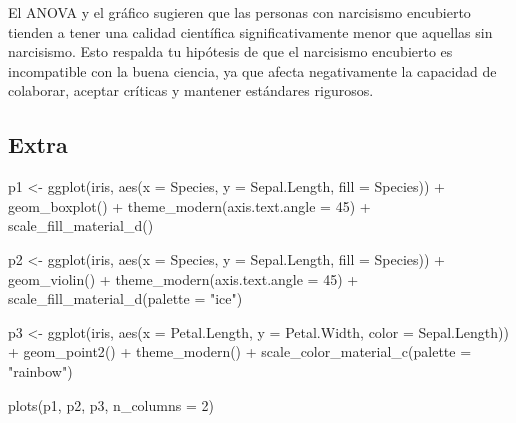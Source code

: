 \documentclass[
]{article}
\newenvironment{Shaded}{\begin{snugshade}}{\end{snugshade}}
\newcommand{\AttributeTok}[1]{\textcolor[rgb]{0.40,0.45,0.13}{#1}}
\newcommand{\DecValTok}[1]{\textcolor[rgb]{0.68,0.00,0.00}{#1}}
\newcommand{\FunctionTok}[1]{\textcolor[rgb]{0.28,0.35,0.67}{#1}}
\newcommand{\NormalTok}[1]{\textcolor[rgb]{0.00,0.23,0.31}{#1}}
\newcommand{\OtherTok}[1]{\textcolor[rgb]{0.00,0.23,0.31}{#1}}
\newcommand{\SpecialCharTok}[1]{\textcolor[rgb]{0.37,0.37,0.37}{#1}}
\newcommand{\StringTok}[1]{\textcolor[rgb]{0.13,0.47,0.30}{#1}}
\begin{document}
El ANOVA y el gráfico sugieren que las personas con narcisismo
encubierto tienden a tener una calidad científica significativamente
menor que aquellas sin narcisismo. Esto respalda tu hipótesis de que el
narcisismo encubierto es incompatible con la buena ciencia, ya que
afecta negativamente la capacidad de colaborar, aceptar críticas y
mantener estándares rigurosos.

\subsection{Extra}\label{extra}

\begin{Shaded}
\begin{Highlighting}[]
\NormalTok{p1 }\OtherTok{\textless{}{-}} \FunctionTok{ggplot}\NormalTok{(iris, }\FunctionTok{aes}\NormalTok{(}\AttributeTok{x =}\NormalTok{ Species, }\AttributeTok{y =}\NormalTok{ Sepal.Length, }\AttributeTok{fill =}\NormalTok{ Species)) }\SpecialCharTok{+}
  \FunctionTok{geom\_boxplot}\NormalTok{() }\SpecialCharTok{+}
  \FunctionTok{theme\_modern}\NormalTok{(}\AttributeTok{axis.text.angle =} \DecValTok{45}\NormalTok{) }\SpecialCharTok{+}
  \FunctionTok{scale\_fill\_material\_d}\NormalTok{()}

\NormalTok{p2 }\OtherTok{\textless{}{-}} \FunctionTok{ggplot}\NormalTok{(iris, }\FunctionTok{aes}\NormalTok{(}\AttributeTok{x =}\NormalTok{ Species, }\AttributeTok{y =}\NormalTok{ Sepal.Length, }\AttributeTok{fill =}\NormalTok{ Species)) }\SpecialCharTok{+}
  \FunctionTok{geom\_violin}\NormalTok{() }\SpecialCharTok{+}
  \FunctionTok{theme\_modern}\NormalTok{(}\AttributeTok{axis.text.angle =} \DecValTok{45}\NormalTok{) }\SpecialCharTok{+}
  \FunctionTok{scale\_fill\_material\_d}\NormalTok{(}\AttributeTok{palette =} \StringTok{"ice"}\NormalTok{)}

\NormalTok{p3 }\OtherTok{\textless{}{-}} \FunctionTok{ggplot}\NormalTok{(iris, }\FunctionTok{aes}\NormalTok{(}\AttributeTok{x =}\NormalTok{ Petal.Length, }\AttributeTok{y =}\NormalTok{ Petal.Width, }\AttributeTok{color =}\NormalTok{ Sepal.Length)) }\SpecialCharTok{+}
  \FunctionTok{geom\_point2}\NormalTok{() }\SpecialCharTok{+}
  \FunctionTok{theme\_modern}\NormalTok{() }\SpecialCharTok{+}
  \FunctionTok{scale\_color\_material\_c}\NormalTok{(}\AttributeTok{palette =} \StringTok{"rainbow"}\NormalTok{)}

\FunctionTok{plots}\NormalTok{(p1, p2, p3, }\AttributeTok{n\_columns =} \DecValTok{2}\NormalTok{)}
\end{Highlighting}
\end{Shaded}
\end{document}
